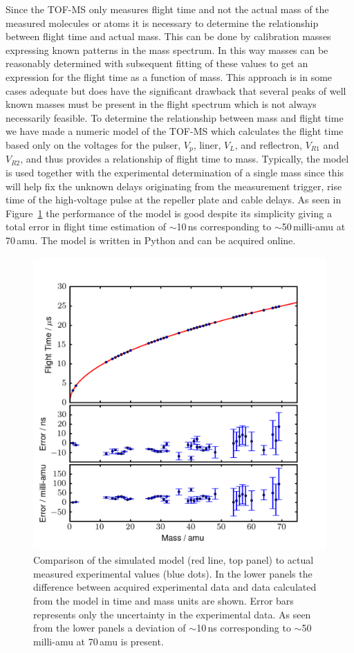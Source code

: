\documentclass[aip,rsi]{revtex4-1}
\begin{document}
Since the TOF-MS only measures flight time and not the actual mass of the measured molecules or atoms it is necessary to determine the relationship between flight time and actual mass. This can be done by calibration masses expressing known patterns in the mass spectrum. In this way masses can be reasonably determined with subsequent fitting of these values to get an expression for the flight time as a function of mass. This approach is in some cases adequate but does have the significant drawback that several peaks of well known masses must be present in the flight spectrum which is not always necessarily feasible. To determine the relationship between mass and flight time we have made a numeric model of the TOF-MS which calculates the flight time based only on the voltages for the pulser, $V_p$, liner, $V_L$, and reflectron, $V_{R1}$ and $V_{R2}$, and thus provides a relationship of flight time to mass. Typically, the model is used together with the experimental determination of a single mass since this will help fix the unknown delays originating from the measurement trigger, rise time of the high-voltage pulse at the repeller plate and cable delays. As seen in Figure~\ref{fig:model_error} the performance of the model is good despite its simplicity giving a total error in flight time estimation of $\sim$10\,ns corresponding to $\sim$50\,milli-amu at 70\,amu. The model is written in Python and can be acquired online\cite{ModelGithub}.
\begin{figure}
 \includegraphics[width=14cm]{model_error.png}%
 \caption{Comparison of the simulated model (red line, top panel) to actual measured experimental values (blue dots). In the lower panels the difference between acquired experimental data and data calculated from the model in time and mass units are shown. Error bars represents only the uncertainty in the experimental data. As seen from the lower panels a deviation of $\sim$10\,ns corresponding to $\sim$50\,milli-amu at 70\,amu is present.\label{fig:model_error}}%
\end{figure}
\end{document}

